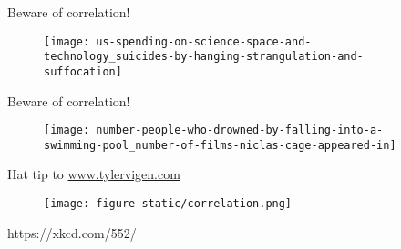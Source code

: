 \documentclass[table]{beamer}\usepackage[]{graphicx}\usepackage[]{color}
\begin{document}

\begin{frame}[fragile]{Beware of correlation!}

\begin{figure}[t]
    \texttt{[image: us-spending-on-science-space-and-technology\_suicides-by-hanging-strangulation-and-suffocation]}  
\end{figure}

\end{frame}

\begin{frame}[fragile]{Beware of correlation!}

\begin{figure}[t]
    \texttt{[image: number-people-who-drowned-by-falling-into-a-swimming-pool\_number-of-films-niclas-cage-appeared-in]}  
\end{figure}

\footnotesize{Hat tip to \href{http://www.tylervigen.com}{www.tylervigen.com}}
\end{frame}



\begin{frame}[fragile]

\begin{figure}[t]
    \texttt{[image: figure-static/correlation.png]}  
\end{figure}

\footnotesize{https://xkcd.com/552/}
\end{frame}



\end{document}
